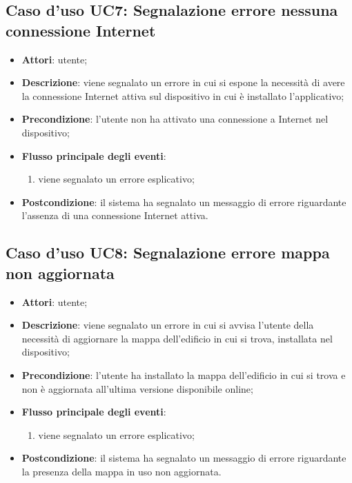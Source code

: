 \documentclass[../AnalisiDeiRequisiti.tex]{subfiles}
\begin{document}
\subsection{Caso d'uso UC7: Segnalazione errore nessuna connessione Internet}
\begin{itemize}
\item \textbf{Attori}: utente;
\item \textbf{Descrizione}: viene segnalato un errore in cui si espone la necessità di avere la connessione Internet attiva sul dispositivo in cui è installato l'applicativo; 
      \item \textbf{Precondizione}: l'utente non ha attivato una connessione a Internet nel dispositivo;

        \item \textbf{Flusso principale degli eventi}:
          \begin{enumerate}
          \item viene segnalato un errore esplicativo;

      \end{enumerate}
    \item \textbf{Postcondizione}: il sistema ha segnalato un messaggio di errore riguardante l'assenza di una connessione Internet attiva.
  \end{itemize}
\hypertarget{UC8}{}
\subsection{Caso d'uso UC8: Segnalazione errore mappa non aggiornata}
\begin{itemize}
\item \textbf{Attori}: utente;
\item \textbf{Descrizione}: viene segnalato un errore in cui si avvisa l'utente della necessità di aggiornare la mappa dell'edificio in cui si trova, installata nel dispositivo; 
      \item \textbf{Precondizione}: l'utente ha installato la mappa dell'edificio in cui si trova e non è aggiornata all'ultima versione disponibile online;

        \item \textbf{Flusso principale degli eventi}:
          \begin{enumerate}
          \item viene segnalato un errore esplicativo;

      \end{enumerate}
    \item \textbf{Postcondizione}: il sistema ha segnalato un messaggio di errore riguardante la presenza della mappa in uso non aggiornata.
  \end{itemize}
\hypertarget{UC9}{}
\end{document}
